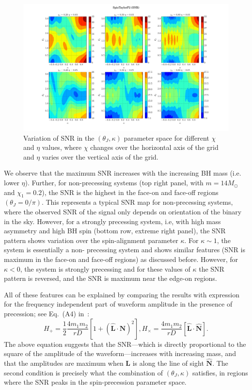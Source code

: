 \begin{figure}[t]
\includegraphics[width=\textwidth]{./images/SNR_GRID_0F.pdf}
\caption{Variation of SNR in the $(\theta_J, \kappa)$ parameter space for 
different $\chi$ and $\eta$ values, where $\chi$ changes over the horizontal 
axis of the grid and $\eta$ varies over the vertical axis of the grid.}
\centering 
\label{fig:SNR} 
\end{figure}

We observe that the maximum SNR increases with the increasing BH mass (i.e.
lower $\eta$). Further, for non-precessing systems (top right panel, with
$m=14 M_\odot$ and $\chi_1=0.2$), the SNR is the highest in the face-on and
face-off regions $(\theta_{J} = 0/\pi)$. This represents a typical SNR map for
non-precessing systems, where the observed SNR of the signal only depends on
orientation of the binary in the sky. However, for a strongly precessing
system, i.e, with high mass asymmetry and high BH spin (bottom row, extreme
right panel), the SNR pattern shows variation over the spin-alignment
parameter $\kappa$. For $\kappa \sim 1$, the system is essentially a non-
precessing system and shows similar features (SNR is maximum in the face-on
and face-off regions) as discussed before. However, for $\kappa < 0$, the
system is strongly precessing and for these values of $\kappa$ the SNR pattern
is reversed, and the SNR is maximum near the edge-on regions.

All of these features can be explained by comparing the results with
expression for the frequency independent part of waveform amplitude in the
presence of precession; see Eq.~(A4) in~\cite{Apostolatos1994}:
\label{amplitudes}
\begin{equation}
H_{+} = \frac{1}{2}\frac{4 m_{1}m_{2}}{rD} \left[1 + (\hat{\mathbf{L}}\cdot\hat{\mathbf{N}})^{2}\right], 
H_{\times} = \frac{4 m_{1}m_{2}}{rD}\left[\hat{\mathbf{L}}\cdot\hat{\mathbf{N}}\right].
\end{equation}
The above equation suggests that the SNR---which is directly proportional to
the square of the  amplitude of the waveform---increases with increasing mass,
and that the amplitudes are maximum when $\mathbf{L}$ is along the line of
sight $\hat{\mathbf{N}}$. The second condition is precisely what the
combination of $(\theta_J, \kappa)$ satisfies, in regions where
the SNR peaks in the spin-precession parameter space.

